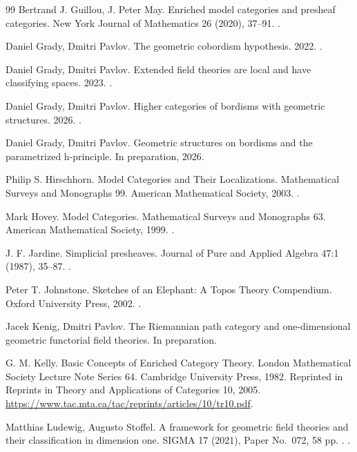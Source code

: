 \documentclass{amsart}
\theoremstyle{definition}
\numberwithin{equation}{subsection}
\numberwithin{subsubsection}{subsection}
\begin{document}
\begin{thebibliography}{99}
  Bertrand J. Guillou, J. Peter May.
  Enriched model categories and presheaf categories.
  New York Journal of Mathematics 26 (2020), 37--91.
  .

  Daniel Grady, Dmitri Pavlov.
  The geometric cobordism hypothesis.
  2022.
  .

  Daniel Grady, Dmitri Pavlov.
  Extended field theories are local and have classifying spaces.
  2023.
  .

  Daniel Grady, Dmitri Pavlov.
  Higher categories of bordisms with geometric structures.
  2026.
  .

  Daniel Grady, Dmitri Pavlov.
  Geometric structures on bordisms and the parametrized h-principle.
  In preparation, 2026.

  Philip S. Hirschhorn.
  Model Categories and Their Localizations.
  Mathematical Surveys and Monographs 99.
  American Mathematical Society, 2003.
  .

  Mark Hovey.
  Model Categories.
  Mathematical Surveys and Monographs 63.
  American Mathematical Society, 1999.
  .

  J. F. Jardine.
  Simplicial presheaves.
  Journal of Pure and Applied Algebra 47:1 (1987), 35--87.
  .

  Peter T. Johnstone.
  Sketches of an Elephant: A Topos Theory Compendium.
  Oxford University Press, 2002.
  .

  Jacek Kenig, Dmitri Pavlov.
  The Riemannian path category and one-dimensional geometric functorial field theories.
  In preparation.

  G. M. Kelly.
  Basic Concepts of Enriched Category Theory.
  London Mathematical Society Lecture Note Series 64.
  Cambridge University Press, 1982.
  Reprinted in Reprints in Theory and Applications of Categories 10, 2005.
  \url{https://www.tac.mta.ca/tac/reprints/articles/10/tr10.pdf}.

  Matthias Ludewig, Augusto Stoffel.
  A framework for geometric field theories and their classification in dimension one.
  SIGMA 17 (2021), Paper No.~072, 58 pp.
  .
  .


\end{thebibliography}
\end{document}
